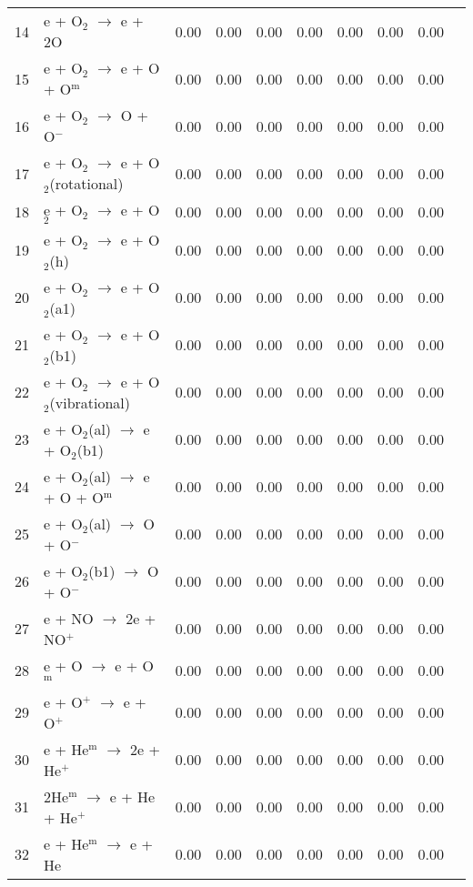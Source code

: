 \documentclass{article}
\begin{document}
\begin{table}[H]
{\begin{tabu}{clcccccccc}
      14 & e + O$_{2}$ $\rightarrow$ e + 2O & 0.00 & 0.00 & 0.00 & 0.00 & 0.00 & 0.00 & 0.00 &  \\
      15 & e + O$_{2}$ $\rightarrow$ e + O + O$^\text{m}$ & 0.00 & 0.00 & 0.00 & 0.00 & 0.00 & 0.00 & 0.00 &  \\
      16 & e + O$_{2}$ $\rightarrow$ O + O$^{-}$ & 0.00 & 0.00 & 0.00 & 0.00 & 0.00 & 0.00 & 0.00 &  \\
      17 & e + O$_{2}$ $\rightarrow$ e + O$_{2}$(rotational) & 0.00 & 0.00 & 0.00 & 0.00 & 0.00 & 0.00 & 0.00 &  \\
      18 & e + O$_{2}$ $\rightarrow$ e + O$_{2}$ & 0.00 & 0.00 & 0.00 & 0.00 & 0.00 & 0.00 & 0.00 &  \\
      19 & e + O$_{2}$ $\rightarrow$ e + O$_{2}$(h) & 0.00 & 0.00 & 0.00 & 0.00 & 0.00 & 0.00 & 0.00 &  \\
      20 & e + O$_{2}$ $\rightarrow$ e + O$_{2}$(a1) & 0.00 & 0.00 & 0.00 & 0.00 & 0.00 & 0.00 & 0.00 &  \\
      21 & e + O$_{2}$ $\rightarrow$ e + O$_{2}$(b1) & 0.00 & 0.00 & 0.00 & 0.00 & 0.00 & 0.00 & 0.00 &  \\
      22 & e + O$_{2}$ $\rightarrow$ e + O$_{2}$(vibrational) & 0.00 & 0.00 & 0.00 & 0.00 & 0.00 & 0.00 & 0.00 &  \\
      23 & e + O$_{2}$(al) $\rightarrow$ e + O$_{2}$(b1) & 0.00 & 0.00 & 0.00 & 0.00 & 0.00 & 0.00 & 0.00 &  \\
      24 & e + O$_{2}$(al) $\rightarrow$ e + O + O$^\text{m}$ & 0.00 & 0.00 & 0.00 & 0.00 & 0.00 & 0.00 & 0.00 &  \\
      25 & e + O$_{2}$(al) $\rightarrow$ O + O$^{-}$ & 0.00 & 0.00 & 0.00 & 0.00 & 0.00 & 0.00 & 0.00 &  \\
      26 & e + O$_{2}$(b1) $\rightarrow$ O + O$^{-}$ & 0.00 & 0.00 & 0.00 & 0.00 & 0.00 & 0.00 & 0.00 &  \\
      27 & e + NO $\rightarrow$ 2e + NO$^{+}$ & 0.00 & 0.00 & 0.00 & 0.00 & 0.00 & 0.00 & 0.00 &  \\
      28 & e + O $\rightarrow$ e + O$^\text{m}$ & 0.00 & 0.00 & 0.00 & 0.00 & 0.00 & 0.00 & 0.00 &  \\
      29 & e + O$^{+}$ $\rightarrow$ e + O$^{+}$ & 0.00 & 0.00 & 0.00 & 0.00 & 0.00 & 0.00 & 0.00 &  \\
      30 & e + He$^\text{m}$ $\rightarrow$ 2e + He$^{+}$ & 0.00 & 0.00 & 0.00 & 0.00 & 0.00 & 0.00 & 0.00 &  \\
      31 & 2He$^\text{m}$ $\rightarrow$ e + He + He$^{+}$ & 0.00 & 0.00 & 0.00 & 0.00 & 0.00 & 0.00 & 0.00 &  \\
      32 & e + He$^\text{m}$ $\rightarrow$ e + He & 0.00 & 0.00 & 0.00 & 0.00 & 0.00 & 0.00 & 0.00 &  \\
    \end{tabu}
  }
\end{table}
\end{document}
